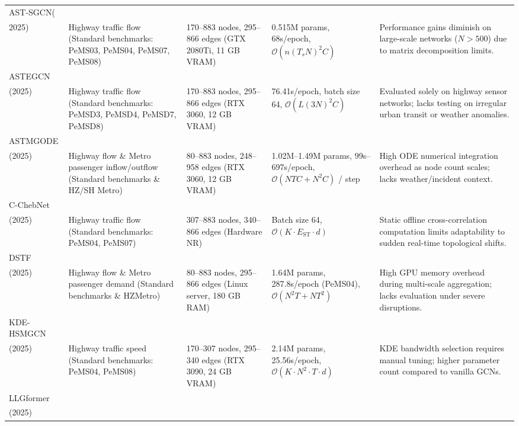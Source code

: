 \begin{longtable}{p{1.5cm} p{2.25cm} p{2.25cm} p{2.25cm} p{2.25cm}}
AST-SGCN(\\2025) ~\cite{wei2025attention} &
Highway traffic flow (Standard benchmarks: PeMS03, PeMS04, PeMS07, PeMS08) &
170--883 nodes, 295--866 edges (GTX 2080Ti, 11 GB VRAM) &
0.515M params, 68s/epoch, $\mathcal{O}(n(T_s N)^2 C)$ &
Performance gains diminish on large-scale networks ($N > 500$) due to matrix decomposition limits. \\
\hline
ASTEGCN\\(2025) ~\cite{zeng2025aste} &
Highway traffic flow (Standard benchmarks: PeMSD3, PeMSD4, PeMSD7, PeMSD8) &
170--883 nodes, 295--866 edges (RTX 3060, 12 GB VRAM) &
76.41s/epoch, batch size 64, $\mathcal{O}(L(3N)^2 C)$ &
Evaluated solely on highway sensor networks; lacks testing on irregular urban transit or weather anomalies. \\
\hline
ASTMGODE\\(2025) ~\cite{chen2025attention} &
Highway flow \& Metro passenger inflow/outflow (Standard benchmarks \& HZ/SH Metro) &
80--883 nodes, 248--958 edges (RTX 3060, 12 GB VRAM) &
1.02M--1.49M params, 99s--697s/epoch, $\mathcal{O}(NTC + N^2C)$ / step &
High ODE numerical integration overhead as node count scales; lacks weather/incident context. \\
\hline
C-ChebNet\\(2025) ~\cite{sun2025chebnet} &
Highway traffic flow (Standard benchmarks: PeMS04, PeMS07) &
307--883 nodes, 340--866 edges (Hardware NR) &
Batch size 64, $\mathcal{O}(K \cdot E_{\text{ST}} \cdot d)$ &
Static offline cross-correlation computation limits adaptability to sudden real-time topological shifts. \\
\hline
DSTF\\(2025) ~\cite{wang2025dstf} &
Highway flow \& Metro passenger demand (Standard benchmarks \& HZMetro) &
80--883 nodes, 295--866 edges (Linux server, 180 GB RAM) &
1.64M params, 287.8s/epoch (PeMS04), $\mathcal{O}(N^2 T + N T^2)$ &
High GPU memory overhead during multi-scale aggregation; lacks evaluation under severe disruptions. \\
\hline
KDE-HSMGCN\\(2025) ~\cite{xu2025heterogeneous} &
Highway traffic speed (Standard benchmarks: PeMS04, PeMS08) &
170--307 nodes, 295--340 edges (RTX 3090, 24 GB VRAM) &
2.14M params, 25.56s/epoch, $\mathcal{O}(K \cdot N^2 \cdot T \cdot d)$ &
KDE bandwidth selection requires manual tuning; higher parameter count compared to vanilla GCNs. \\
\hline
LLGformer\\(2025) ~\cite{jin2025llgformer} &

\end{longtable}
